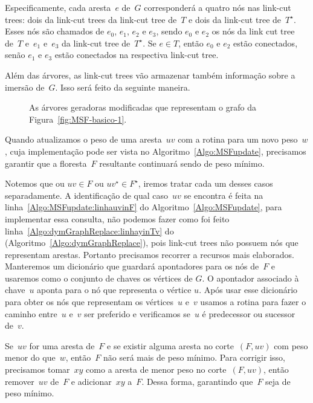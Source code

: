 Especificamente, cada aresta~$e$ de~$G$ corresponderá a quatro nós nas link-cut trees: dois da link-cut trees da link-cut tree de~$T$ e dois da link-cut tree de~$T^\star$.
Esses nós são chamados de $e_0$, $e_1$, $e_2$ e $e_3$, sendo $e_0$ e $e_2$ os nós da link cut tree de~$T$ e~$e_1$ e~$e_3$ da link-cut tree de~$T^\star$.
Se $e\in T$, então $e_0$ e $e_2$ estão conectados, senão $e_1$ e $e_3$ estão conectados na respectiva link-cut tree.

Além das árvores, as link-cut trees vão armazenar também informação sobre a imersão de~$G$.
Isso será feito da seguinte maneira.



\begin{figure}[htb]
\centering

\caption{As árvores geradoras modificadas que representam o grafo da Figura~\ref{fig:MSF-basico-1}.}
\label{fig:MSF-figura-3}
\end{figure}


Quando atualizamos o peso de uma aresta~$uv$ com a rotina \MSFupdate{} para um novo peso~$w$, cuja implementação pode ser vista no Algoritmo~\ref{Algo:MSFupdate}, precisamos garantir que a floresta~$F$ resultante continuará sendo  de peso mínimo.

Notemos que ou $uv\in F$ ou $uv^\star\in F^\star$, iremos tratar cada um desses casos separadamente.
A identificação de qual caso~$uv$ se encontra é feita na linha~\ref{Algo:MSFupdate:linhauvinF} do Algoritmo~\ref{Algo:MSFupdate}, para implementar essa consulta, não podemos fazer como foi feito linha~\ref{Algo:dymGraphReplace:linhayinTv} do \dymGraphReplace(Algoritmo~\ref{Algo:dymGraphReplace}), pois link-cut trees não possuem nós que representam arestas.
Portanto precisamos recorrer a recursos mais elaborados.
Manteremos um dicionário que guardará apontadores para os nós de~$F$ e usaremos como o conjunto de chaves os vértices de $G$. O apontador associado à chave~$u$ aponta para o nó que representa o vértice $u$.
Após usar esse dicionário para obter os nós que representam os vértices~$u$ e~$v$ usamos a rotina \linkcutPath{} para fazer o caminho entre~$u$ e~$v$ ser preferido e verificamos se~$u$ é predecessor ou sucessor de~$v$.

Se~$uv$ for uma aresta de~$F$ e se existir alguma aresta no corte~$(F, uv)$ com peso menor do que~$w$, então~$F$ não será mais de peso mínimo.
Para corrigir isso, precisamos tomar~$xy$ como a aresta de menor peso no corte~$(F, uv)$,
então remover~$uv$ de~$F$ e adicionar~$xy$ a~$F$.
Dessa forma, garantindo que~$F$ seja de peso mínimo.

